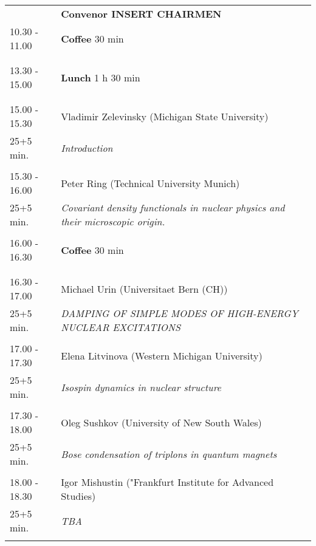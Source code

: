 \begin{longtable}{p{3cm}p{13cm}}
&\hfill {\bf Convenor INSERT CHAIRMEN }\\ 
10.30 - 11.00 & {\bf Coffee} \hfill 30 min \\ 
 & \\ 
 & \\ 
13.30 - 15.00 & {\bf Lunch} \hfill 1 h 30 min \\ 
 & \\ 
 & \\ 
15.00 - 15.30 & Vladimir Zelevinsky (Michigan State University)\\ 
25+5 min. & {\it Introduction}\\ 
 & \\ 
15.30 - 16.00 & Peter Ring (Technical University Munich)\\ 
25+5 min. & {\it Covariant density functionals in nuclear physics and their microscopic origin.}\\ 
 & \\ 
16.00 - 16.30 & {\bf Coffee} \hfill 30 min \\ 
 & \\ 
 & \\ 
16.30 - 17.00 & Michael Urin (Universitaet Bern (CH))\\ 
25+5 min. & {\it DAMPING OF SIMPLE MODES OF HIGH-ENERGY NUCLEAR EXCITATIONS}\\ 
 & \\ 
17.00 - 17.30 & Elena Litvinova (Western Michigan University)\\ 
25+5 min. & {\it Isospin dynamics in nuclear structure}\\ 
 & \\ 
17.30 - 18.00 & Oleg Sushkov (University of New South Wales)\\ 
25+5 min. & {\it Bose condensation of triplons in quantum magnets}\\ 
 & \\ 
18.00 - 18.30 & Igor Mishustin ("Frankfurt Institute for Advanced Studies)\\ 
25+5 min. & {\it TBA}\\ 
 & \\ 
\end{longtable}

